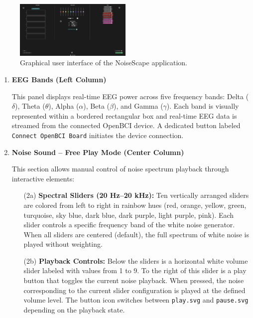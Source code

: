 \begin{figure}[H]
\centering
\includegraphics[width=0.5\textwidth]{interface.png}
\caption{Graphical user interface of the NoiseScape application.}
\end{figure}

\begin{enumerate}
\item \textbf{EEG Bands (Left Column)}

This panel displays real-time EEG power across five frequency bands: Delta ($\delta$), Theta ($\theta$), Alpha ($\alpha$), Beta ($\beta$), and Gamma ($\gamma$). Each band is visually represented within a bordered rectangular box and real-time EEG data is streamed from the connected OpenBCI device. A dedicated button labeled \texttt{Connect OpenBCI Board} initiates the device connection. \\

\item \textbf{Noise Sound – Free Play Mode (Center Column)}

This section allows manual control of noise spectrum playback through interactive elements:

\begin{enumerate}
  \item[(2a)] \textbf{Spectral Sliders (20 Hz–20 kHz):} Ten vertically arranged sliders are colored from left to right in rainbow hues (red, orange, yellow, green, turquoise, sky blue, dark blue, dark purple, light purple, pink). Each slider controls a specific frequency band of the white noise generator. When all sliders are centered (default), the full spectrum of white noise is played without weighting.

  \item[(2b)] \textbf{Playback Controls:} Below the sliders is a horizontal white volume slider labeled with values from 1 to 9. To the right of this slider is a play button that toggles the current noise playback. When pressed, the noise corresponding to the current slider configuration is played at the defined volume level. The button icon switches between \texttt{play.svg} and \texttt{pause.svg} depending on the playback state.


\end{enumerate}
\end{enumerate}
